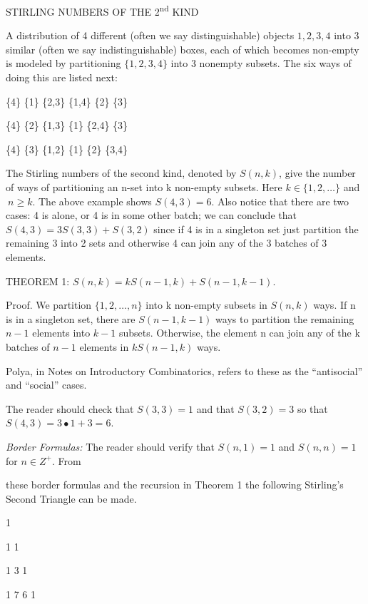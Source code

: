 


STIRLING NUMBERS OF THE 2\textsuperscript{nd} KIND

A distribution of 4 different (often we say distinguishable) objects
\(1,2,3,4\) into 3 similar (often we say indistinguishable) boxes, each
of which becomes non-empty is modeled by partitioning \(\{ 1,2,3,4\}\)
into 3 nonempty subsets. The six ways of doing this are listed next:

\{4\} \{1\} \{2,3\} \{1,4\} \{2\} \{3\}

\{4\} \{2\} \{1,3\} \{1\} \{2,4\} \{3\}

\{4\} \{3\} \{1,2\} \{1\} \{2\} \{3,4\}

The Stirling numbers of the second kind, denoted by \(S(n,k)\), give the
number of ways of partitioning an n-set into k non-empty subsets. Here
\(k \in \{ 1,2,\ldots\}\) and\(\ n \geq k\). The above example shows
\(S\left( 4,3 \right) = 6\). Also notice that there are two cases: 4 is
alone, or 4 is in some other batch; we can conclude that
\(S\left( 4,3 \right) = 3S\left( 3,3 \right) + S(3,2)\) since if 4 is in
a singleton set just partition the remaining 3 into 2 sets and otherwise
4 can join any of the 3 batches of 3 elements.

THEOREM 1:
\(S\left( n,k \right) = kS\left( n - 1,k \right) + S(n - 1,k - 1)\).

Proof. We partition \(\{ 1,2,\ldots,n\}\) into k non-empty subsets in
\(S(n,k)\) ways. If n is in a singleton set, there are
\(S(n - 1,k - 1)\) ways to partition the remaining \(n - 1\) elements
into \(k - 1\) subsets. Otherwise, the element n can join any of the k
batches of \(n - 1\) elements in \(kS(n - 1,k)\) ways.

Polya, in Notes on Introductory Combinatorics, refers to these as the
``antisocial'' and ``social'' cases.

The reader should check that \(S\left( 3,3 \right) = 1\) and that
\(S\left( 3,2 \right) = 3\) so that
\(S\left( 4,3 \right) = 3 \bullet 1 + 3 = 6\).

\emph{Border Formulas:} The reader should verify that
\(S\left( n,1 \right) = 1\) and \(S\left( n,n \right) = 1\) for
\(n \in Z^{+}\). From

these border formulas and the recursion in Theorem 1 the following
Stirling's Second Triangle can be made.

1

1 1

1 3 1

1 7 6 1

